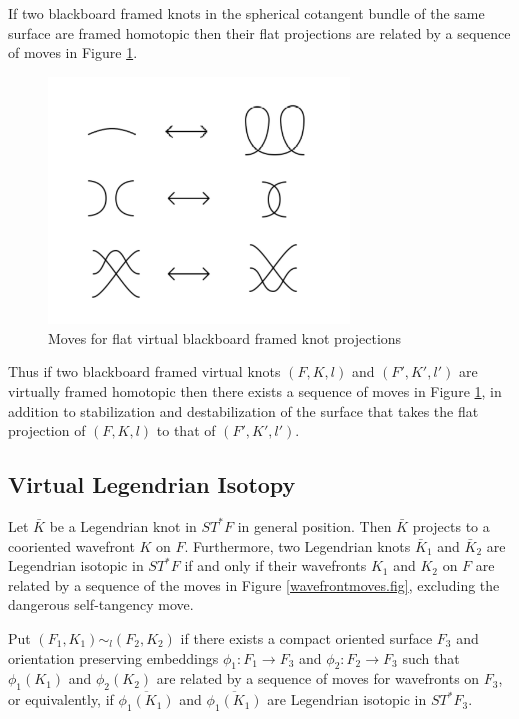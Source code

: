 If two blackboard framed knots in the spherical cotangent bundle of the same surface are framed homotopic then their flat projections are related by a sequence of moves in Figure \ref{flatBlackboardFrontMoves.fig}.

\begin{figure}[htbp]
	\includegraphics[width=8cm]{flatBlackboardFrontMoves}
	\caption{Moves for flat virtual blackboard framed knot projections}
	\label{flatBlackboardFrontMoves.fig}
\end{figure}

Thus if two blackboard framed virtual knots $(F,K, l)$ and $(F',K',l')$ are virtually framed homotopic then there exists a sequence of moves in Figure \ref{flatBlackboardFrontMoves.fig}, in addition to stabilization and destabilization of the surface that takes the flat projection of $(F, K, l)$ to that of $(F', K', l')$.


\subsection{Virtual Legendrian Isotopy}\label{defvirtlegiso}
Let $\bar{K}$ be a Legendrian knot in $ST^*F$ in general position.  Then $\bar{K}$ projects to a cooriented wavefront $K$ on $F$.  Furthermore, two Legendrian knots $\bar{K}_1$ and $\bar{K}_2$ are Legendrian isotopic in $ST^*F$ if and only if their wavefronts $K_1$ and $K_2$ on $F$ are related by a sequence of the moves in Figure \ref{wavefrontmoves.fig}, excluding the dangerous self-tangency move.  


Put $(F_1, K_1) \sim_l (F_2, K_2)$ if there exists a compact oriented surface $F_3$ and orientation preserving embeddings $\phi_1: F_1\rightarrow F_3$ and $\phi_2: F_2\rightarrow F_3$ such that $\phi_1(K_1)$ and $\phi_2(K_2)$ are related by a sequence of moves for wavefronts on $F_3$, or equivalently, if $\overline{\phi_1(K_1)}$ and $\overline{\phi_1(K_1)}$ are Legendrian isotopic in $ST^*F_3$.  

